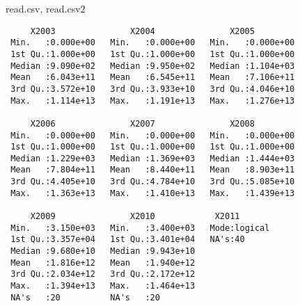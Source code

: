 \documentclass[xcolor={usenames,svgnames,dvipsnames}]{beamer}
\begin{document}
\begin{frame}[fragile,label=sec-2-3]{read.csv, read.csv2}
\begin{verbatim}
     X2003               X2004               X2005          
 Min.   :0.000e+00   Min.   :0.000e+00   Min.   :0.000e+00  
 1st Qu.:1.000e+00   1st Qu.:1.000e+00   1st Qu.:1.000e+00  
 Median :9.090e+02   Median :9.950e+02   Median :1.104e+03  
 Mean   :6.043e+11   Mean   :6.545e+11   Mean   :7.106e+11  
 3rd Qu.:3.572e+10   3rd Qu.:3.933e+10   3rd Qu.:4.046e+10  
 Max.   :1.114e+13   Max.   :1.191e+13   Max.   :1.276e+13  
                                                            
     X2006               X2007               X2008          
 Min.   :0.000e+00   Min.   :0.000e+00   Min.   :0.000e+00  
 1st Qu.:1.000e+00   1st Qu.:1.000e+00   1st Qu.:1.000e+00  
 Median :1.229e+03   Median :1.369e+03   Median :1.444e+03  
 Mean   :7.804e+11   Mean   :8.440e+11   Mean   :8.903e+11  
 3rd Qu.:4.405e+10   3rd Qu.:4.784e+10   3rd Qu.:5.085e+10  
 Max.   :1.363e+13   Max.   :1.410e+13   Max.   :1.439e+13  
                                                            
     X2009               X2010            X2011        
 Min.   :3.150e+03   Min.   :3.400e+03   Mode:logical  
 1st Qu.:3.357e+04   1st Qu.:3.401e+04   NA's:40       
 Median :9.680e+10   Median :9.943e+10                 
 Mean   :1.816e+12   Mean   :1.940e+12                 
 3rd Qu.:2.034e+12   3rd Qu.:2.172e+12                 
 Max.   :1.394e+13   Max.   :1.464e+13                 
 NA's   :20          NA's   :20
\end{verbatim}
\end{frame}
\end{document}
